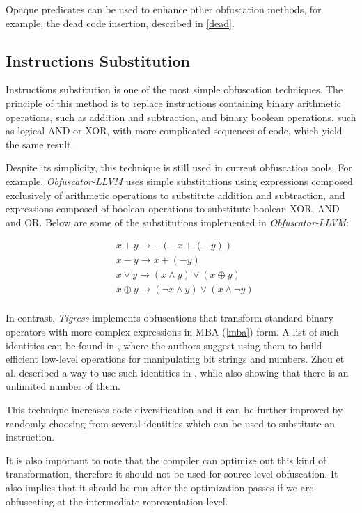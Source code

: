 \documentclass[
  digital, %
  notable,   %
  twoside, %
  nolof,     %
  nolot,     %
]{fithesis3}
\theoremstyle{definition}
\begin{document}
Opaque predicates can be used to enhance other obfuscation methods, for example, the dead code insertion, described in \ref{dead}. 

\subsection{Instructions Substitution} \label{substitution}
Instructions substitution is one of the most simple obfuscation techniques. The principle of this method is to replace instructions containing binary arithmetic operations, such as addition and subtraction, and binary boolean operations, such as logical AND or XOR, with more complicated sequences of code, which yield the same result. 

Despite its simplicity, this technique is still used in current obfuscation tools. For example, \textit{Obfuscator-LLVM} uses simple substitutions using expressions composed exclusively of arithmetic operations to substitute addition and subtraction, and expressions composed of boolean operations to substitute boolean XOR, AND and OR. Below are some of the substitutions implemented in \textit{Obfuscator-LLVM}:

$$
    \begin{aligned}
    &x + y \rightarrow -(-x + (-y))\\
    &x - y \rightarrow x + (-y)\\
    &x \vee y \rightarrow (x \wedge y) \vee (x \oplus y)\\
    &x \oplus y \rightarrow (\neg x \wedge y ) \vee (x \wedge \neg y)\\ 
    \end{aligned}
$$

In contrast, \textit{Tigress} implements obfuscations that transform standard binary operators with more complex expressions in MBA (\ref{mba}) form. A list of such identities can be found in \cite{hackers_delight}, where the authors suggest using them to build efficient low-level operations for manipulating bit strings and numbers. Zhou et al. described a way to use such identities in \cite{mba_zhou}, while also showing that there is an unlimited number of them. 

This technique increases code diversification and it can be further improved by randomly choosing from several identities which can be used to substitute an instruction. 

It is also important to note that the compiler can optimize out this kind of transformation, therefore it should not be used for source-level obfuscation. It also implies that it should be run after the optimization passes if we are obfuscating at the intermediate representation level. 
\end{document}
